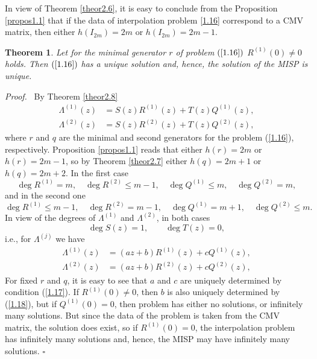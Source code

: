 \documentclass{amsart}
\newtheorem{theorem}{Theorem}[section]
\begin{document}
\medskip

In view of Theorem \ref{theor2.6}, it is easy to conclude from the
Proposition \ref{propos1.1} that if the data of interpolation
problem \eqref{1.16} correspond to a CMV matrix, then either
$h(I_{2m})=2m$ or $h(I_{2m})=2m-1$.

\begin{theorem}\label{theormain}
Let for the minimal generator $r$ of problem $(\ref{1.16})$
$R^{(1)}(0) \ne 0$ holds. Then $(\ref{1.16})$ has a unique solution
and, hence, the solution of the MISP is unique.
\end{theorem}

{\it Proof.} \ By Theorem \ref{theor2.8}
$$ \begin{aligned} {\Lambda}^{(1)}(z) &= S(z)R^{(1)}(z) + T(z)
Q^{(1)}(z),\\
{\Lambda}^{(2)}(z) &= S(z)R^{(2)}(z) + T(z) Q^{(2)}(z), \end{aligned} $$
where $r$ and $q$ are the minimal and second generators for the
problem (\ref{1.16}), respectively. Proposition \ref{propos1.1}
reads that either $h(r)=2m$ or $h(r)=2m-1$, so by Theorem
\ref{theor2.7} either $h(q)=2m+1$ or $h(q)=2m+2$. In the first case
$$ \deg R^{(1)} =m, \quad \deg R^{(2)}\leq m-1, \quad \deg
Q^{(1)}\le m, \quad \deg Q^{(2)}=m, $$ and in the second one
$$ \deg R^{(1)} \le m-1, \quad \deg R^{(2)}=m-1, \quad \deg
Q^{(1)}= m+1, \quad \deg Q^{(2)}\le m. $$
 In view of the degrees of ${\Lambda}^{(1)}$ and ${\Lambda}^{(2)}$, in both cases
$$ \deg S(z)=1, \qquad \deg T(z) =0,
$$
i.e., for ${\Lambda}^{(j)}$ we have
\begin{equation} \label{1.18.5}
\begin{aligned}
{\Lambda}^{(1)}(z) &= (az + b)R^{(1)}(z) + c
Q^{(1)}(z), \\
{\Lambda}^{(2)}(z) &=  (az + b)R^{(2)}(z) + c Q^{(2)}(z), \end{aligned}
\end{equation}
For fixed $r$ and $q$, it is easy to see that $a$ and $c$ are
uniquely determined by condition (\ref{1.17}). If $R^{(1)}(0)\ne 0$,
then $b$ is also uniquely determined by (\ref{1.18}), but if
$Q^{(1)}(0)=0$, then problem has either no solutions, or infinitely
many solutions. But since the data of the problem is taken from the
CMV matrix, the solution does exist, so if $R^{(1)}(0)=0$, the
interpolation problem has infinitely many solutions and, hence, the
MISP may have infinitely many solutions. \hfill $\square$

\bigskip
\end{document}
